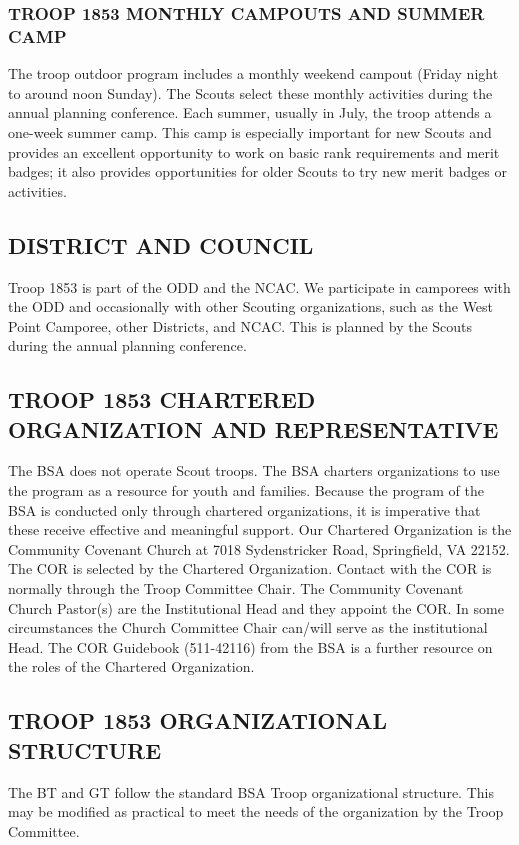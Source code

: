 \documentclass{ltxguide}
\begin{document}
\subsubsection{TROOP 1853 MONTHLY CAMPOUTS AND SUMMER CAMP}
The troop outdoor program includes a monthly weekend campout (Friday night to around noon Sunday). The Scouts select these monthly activities during the annual planning conference. Each summer, usually in July, the troop attends a one-week summer camp. This camp is especially important for new Scouts and provides an excellent opportunity to work on basic rank requirements and merit badges; it also provides opportunities for older Scouts to try new merit badges or activities.

\subsection{DISTRICT AND COUNCIL}
Troop 1853 is part of the \ac{ODD} and the \ac{NCAC}. We participate in camporees with the \ac{ODD} and occasionally with other Scouting organizations, such as the West Point Camporee, other Districts, and \ac{NCAC}. This is planned by the Scouts during the annual planning conference.

\subsection{TROOP 1853 CHARTERED ORGANIZATION AND REPRESENTATIVE}
The \ac{BSA} does not operate Scout troops. The \ac{BSA} charters organizations to use the program as a resource for youth and families. Because the program of the \ac{BSA} is conducted only through chartered organizations, it is imperative that these  receive effective and meaningful support. Our Chartered Organization is the Community Covenant Church at 7018 Sydenstricker Road, Springfield, VA 22152. The \ac{COR} is selected by the Chartered Organization. Contact with the \ac{COR} is normally through the Troop Committee Chair. The Community Covenant Church Pastor(s) are the Institutional Head and they appoint the \ac{COR}. In some circumstances the Church Committee Chair can/will serve as the institutional Head. The \ac{COR} Guidebook (511-42116) from the \ac{BSA} is a further resource on the roles of the Chartered Organization.

\subsection{TROOP 1853 ORGANIZATIONAL STRUCTURE}
\label{TroopOrgStruct}
The \ac{BT} and \ac{GT} follow the standard \ac{BSA} Troop organizational structure. This may be modified as practical to meet the needs of the organization by the Troop Committee.
\end{document}
